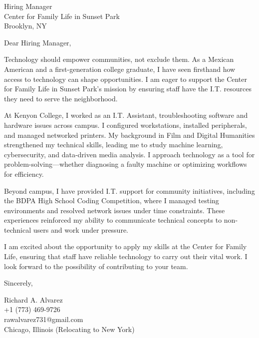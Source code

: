 \documentclass[a4paper,10pt]{letter}
\begin{document}
\begin{letter}{
Hiring Manager \\
Center for Family Life in Sunset Park \\
Brooklyn, NY}

\opening{Dear Hiring Manager,}

Technology should empower communities, not exclude them. As a Mexican American and a first-generation college graduate, I have seen firsthand how access to technology can shape opportunities. I am eager to support the Center for Family Life in Sunset Park’s mission by ensuring staff have the I.T. resources they need to serve the neighborhood. 

At Kenyon College, I worked as an I.T. Assistant, troubleshooting software and hardware issues across campus. I configured workstations, installed peripherals, and managed networked printers. My background in Film and Digital Humanities strengthened my technical skills, leading me to study machine learning, cybersecurity, and data-driven media analysis. I approach technology as a tool for problem-solving—whether diagnosing a faulty machine or optimizing workflows for efficiency. 

Beyond campus, I have provided I.T. support for community initiatives, including the BDPA High School Coding Competition, where I managed testing environments and resolved network issues under time constraints. These experiences reinforced my ability to communicate technical concepts to non-technical users and work under pressure. 

I am excited about the opportunity to apply my skills at the Center for Family Life, ensuring that staff have reliable technology to carry out their vital work. I look forward to the possibility of contributing to your team.

\closing{Sincerely,}

Richard A. Alvarez \\
+1 (773) 469-9726 \\
rawalvarez731@gmail.com \\
Chicago, Illinois (Relocating to New York)

\end{letter}
\end{document}
